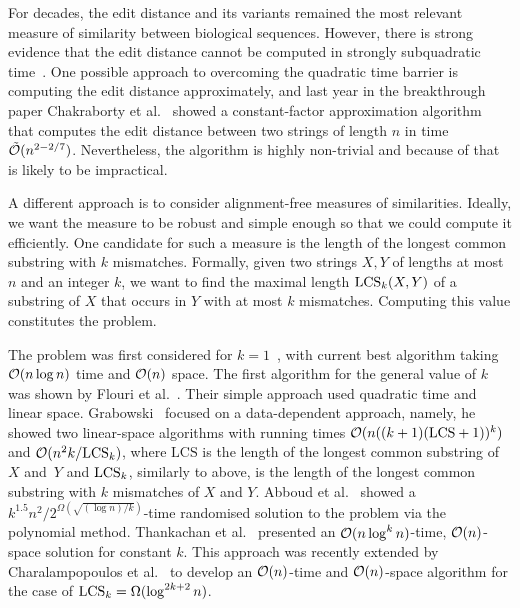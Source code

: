 For decades, the edit distance and its variants remained the most relevant measure of similarity between biological sequences. However, there is strong evidence that the edit distance cannot be computed in strongly subquadratic time~\cite{DBLP:conf/stoc/BackursI15}. 
One possible approach to overcoming the quadratic time barrier is computing the edit distance approximately, and last year in the breakthrough paper Chakraborty et al.~\cite{DBLP:conf/focs/ChakrabortyDGKS18} showed a constant-factor approximation algorithm that computes the edit distance between two strings of length $n$ in time $\tilde{\mathcal{O}}(n^{2-2/7})$. Nevertheless, the algorithm is highly non-trivial and because of that is likely to be impractical. 

A different approach is to consider alignment-free measures of similarities. Ideally, we want the measure to be robust and simple enough so that we could compute it efficiently. One candidate for such a measure is the length of the longest common substring with $k$ mismatches. Formally, given two strings $X,  Y$ of lengths at most $n$ and an integer $k$, we want to find the maximal length $\mathrm{LCS}_{k}(X,Y)$ of a substring of $X$ that occurs in $Y$ with at most $k$ mismatches. Computing this value constitutes the \kLCS problem.

The \kLCS problem was first considered for $k = 1$~\cite{DBLP:journals/poit/BabenkoS11,DBLP:journals/ipl/FlouriGKU15}, with current best algorithm taking $\mathcal{O}(n \log n)$ time and $\mathcal{O}(n)$ space. The first algorithm for the general value of $k$ was shown by Flouri et al.~\cite{DBLP:journals/ipl/FlouriGKU15}. Their simple approach used quadratic time and linear space. Grabowski~\cite{DBLP:journals/ipl/Grabowski15} focused on a data-dependent approach, namely, he showed two linear-space algorithms with running times $\mathcal{O} (n ((k+1) (\mathrm{LCS}+1))^k)$ and $\mathcal{O} (n^2 k/\mathrm{LCS}_{k})$, where $\mathrm{LCS}$ is the length of the longest common substring of $X$ and~$Y$ and $\mathrm{LCS}_{k}$, similarly to above, is the length of the longest common substring with $k$ mismatches of $X$ and $Y$. Abboud et al.~\cite{DBLP:conf/soda/AbboudWY15} showed a $k^{1.5} n^2 / 2^{\Omega(\sqrt{(\log n)/k})}$-time randomised solution to the problem via the polynomial method. Thankachan et al.~\cite{DBLP:journals/jcb/ThankachanAA16} presented an $\mathcal{O}(n \log^k n)$-time, $\mathcal{O}(n)$-space solution for constant $k$. This approach was recently extended by Charalampopoulos et al.~\cite{DBLP:conf/cpm/Charalampopoulos18} to develop an $\mathcal{O}(n)$-time  and $\mathcal{O}(n)$-space algorithm for the case of $\mathrm{LCS}_{k} = \Omega(\log^{2k+2} n)$.

